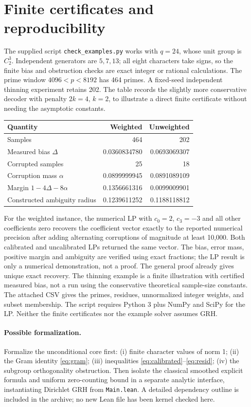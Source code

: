 \documentclass[11pt]{article}
\theoremstyle{remark}\newtheorem{remark}[theorem]{Remark}
\newcommand{\code}[1]{\texttt{#1}}
\begin{document}
\section{Finite certificates and reproducibility}
The supplied script \code{check\_examples.py} works with $q=24$, whose unit group is $C_2^3$. Independent generators are $5,7,13$; all eight characters take signs, so the finite bias and obstruction checks are exact integer or rational calculations. The prime window $4096<p<8192$ has 464 primes. A fixed-seed independent thinning experiment retains 202. The table records the slightly more conservative decoder with penalty $2k=4$, $k=2$, to illustrate a direct finite certificate without needing the asymptotic constants.
\begin{center}
\begin{tabular}{lrr}
\toprule
Quantity & Weighted & Unweighted\\
\midrule
Samples &464&202\\
Measured bias $\Delta$ &0.0360834780&0.0693069307\\
Corrupted samples &25&18\\
Corruption mass $\alpha$&0.0899999945&0.0891089109\\
Margin $1-4\Delta-8\alpha$&0.1356661316&0.0099009901\\
Constructed ambiguity radius&0.1239611252&0.1188118812\\
\bottomrule
\end{tabular}
\end{center}
For the weighted instance, the numerical LP with $c_0=2$, $c_3=-3$ and all other coefficients zero recovers the coefficient vector exactly to the reported numerical precision after adding alternating corruptions of magnitude at least 10,000. Both calibrated and uncalibrated LPs returned the same vector. The bias, error mass, positive margin and ambiguity are verified using exact fractions; the LP result is only a numerical demonstration, not a proof. The general proof already gives unique exact recovery. The thinning example is a finite illustration with certified measured bias, not a run using the conservative theoretical sample-size constants. The attached CSV gives the primes, residues, unnormalized integer weights, and subset membership. The script requires Python 3 plus NumPy and SciPy for the LP. Neither the finite certificates nor the example solver assumes GRH.

\paragraph{Possible formalization.} Formalize the unconditional core first: (i) finite character values of norm 1; (ii) the Gram identity \eqref{eq:gram}; (iii) inequalities \eqref{eq:calibrated}--\eqref{eq:resid}; (iv) the subgroup orthogonality obstruction. Then isolate the classical smoothed explicit formula and uniform zero-counting bound in a separate analytic interface, instantiating Dirichlet GRH from \code{Main.lean}. A detailed dependency outline is included in the archive; no new Lean file has been kernel checked here.
\end{document}
